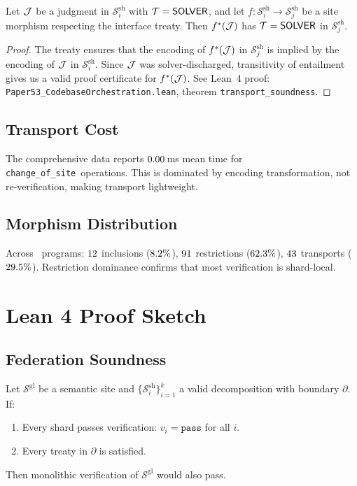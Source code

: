 \documentclass[11pt]{article}
\newcommand{\ShardSite}{\mathcal{S}^{\mathrm{sh}}}
\newcommand{\GlobalSite}{\mathcal{S}^{\mathrm{gl}}}
\newcommand{\ChangeOfSite}{\texttt{change\_of\_site}}
\begin{document}
\begin{theorem}\label{thm:transport}
Let $\mathcal{J}$ be a judgment in $\ShardSite_i$ with $\mathcal{T} = \mathsf{SOLVER}$,
and let $f\colon \ShardSite_i \to \ShardSite_j$ be a site morphism
respecting the interface treaty.  Then $f^*(\mathcal{J})$ has $\mathcal{T} =
\mathsf{SOLVER}$ in $\ShardSite_j$.
\end{theorem}

\begin{proof}
The treaty ensures that the encoding of $f^*(\mathcal{J})$ in $\ShardSite_j$
is implied by the encoding of $\mathcal{J}$ in $\ShardSite_i$.  Since $\mathcal{J}$
was solver-discharged, transitivity of entailment gives us a valid
proof certificate for $f^*(\mathcal{J})$.  See Lean~4 proof:
\texttt{Paper53\_CodebaseOrchestration.lean}, theorem
\texttt{transport\_soundness}.
\end{proof}

\subsection{Transport Cost}
The comprehensive data reports $0.00$\,ms mean
time for \ChangeOfSite\ operations.  This is dominated by encoding
transformation, not re-verification, making transport lightweight.

\subsection{Morphism Distribution}
Across \compTotalPrograms\ programs: $12$ inclusions
($8.2\%$), $91$ restrictions
($62.3\%$), $43$ transports
($29.5\%$).  Restriction dominance confirms that
most verification is shard-local.

\section{Lean 4 Proof Sketch}\label{sec:lean-proof}

\subsection{Federation Soundness}

\begin{theorem}\label{thm:federation-soundness}
Let $\GlobalSite$ be a semantic site and $\{\ShardSite_i\}_{i=1}^k$
a valid decomposition with boundary $\partial$.  If:
\begin{enumerate}[noitemsep]
  \item Every shard passes verification: $v_i = \texttt{pass}$ for
        all $i$.
  \item Every treaty in $\partial$ is satisfied.
\end{enumerate}
Then monolithic verification of $\GlobalSite$ would also pass.
\end{theorem}
\end{document}

